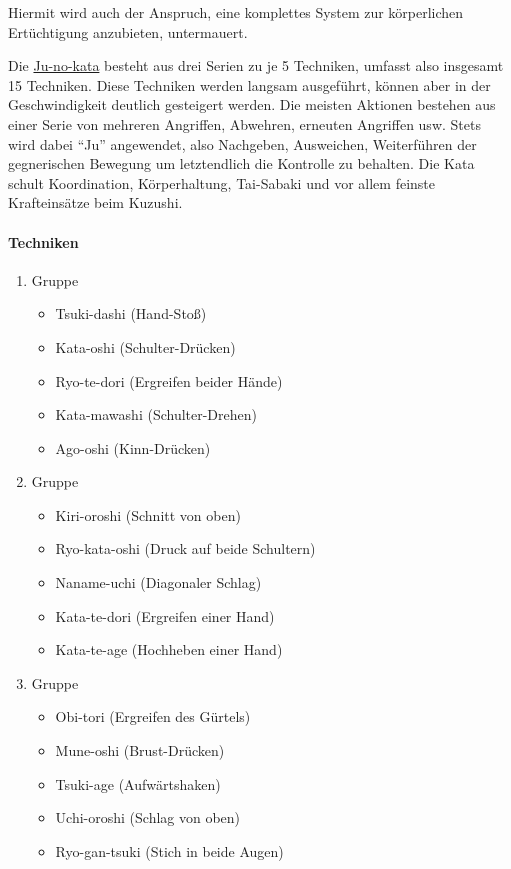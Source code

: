 \documentclass[justified, a4paper, notitlepage, captions=tableheading, nobib]{tufte-handout}
\begin{document}
Hiermit wird auch der Anspruch, eine komplettes System zur körperlichen Ertüchtigung anzubieten, untermauert.

Die \hyperref[orgde09d8a]{Ju-no-kata} besteht aus drei Serien zu je 5 Techniken, umfasst also insgesamt 15 Techniken. 
Diese Techniken werden langsam ausgeführt, können aber in der Geschwindigkeit deutlich gesteigert werden. 
Die meisten Aktionen bestehen aus einer Serie von mehreren Angriffen, Abwehren, erneuten Angriffen usw. 
Stets wird dabei "`Ju"' angewendet, also Nachgeben, Ausweichen, Weiterführen der gegnerischen Bewegung um letztendlich die Kontrolle zu behalten. 
Die Kata schult Koordination, Körperhaltung, Tai-Sabaki und vor allem feinste Krafteinsätze beim Kuzushi.

\paragraph{Techniken}
\label{sec:orgd8c95dc}
\begin{enumerate}
\item Gruppe
\begin{itemize}
\item Tsuki-dashi (Hand-Stoß)
\item Kata-oshi (Schulter-Drücken)
\item Ryo-te-dori (Ergreifen beider Hände)
\item Kata-mawashi (Schulter-Drehen)
\item Ago-oshi (Kinn-Drücken)
\end{itemize}
\item Gruppe
\begin{itemize}
\item Kiri-oroshi (Schnitt von oben)
\item Ryo-kata-oshi (Druck auf beide Schultern)
\item Naname-uchi (Diagonaler Schlag)
\item Kata-te-dori (Ergreifen einer Hand)
\item Kata-te-age (Hochheben einer Hand)
\end{itemize}
\item Gruppe
\begin{itemize}
\item Obi-tori (Ergreifen des Gürtels)
\item Mune-oshi (Brust-Drücken)
\item Tsuki-age (Aufwärtshaken)
\item Uchi-oroshi (Schlag von oben)
\item Ryo-gan-tsuki (Stich in beide Augen)
\end{itemize}
\end{enumerate}
\end{document}
